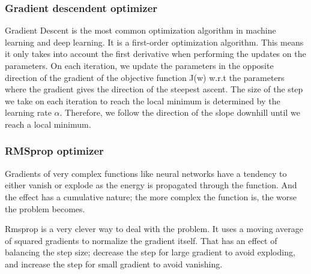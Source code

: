 \subsubsection{Gradient descendent optimizer}

Gradient Descent is the most common optimization algorithm in machine learning and deep learning. It is a first-order optimization algorithm. This means it only takes into account the first derivative when performing the updates on the parameters. On each iteration, we update the parameters in the opposite direction of the gradient of the objective function J(w) w.r.t the parameters where the gradient gives the direction of the steepest ascent. The size of the step we take on each iteration to reach the local minimum is determined by the learning rate $\alpha$. Therefore, we follow the direction of the slope downhill until we reach a local minimum.

\subsubsection{RMSprop optimizer}

Gradients of very complex functions like neural networks have a tendency to either vanish or explode as the energy is propagated through the function. And the effect has a cumulative nature; the more complex the function is, the worse the problem becomes.

Rmsprop is a very clever way to deal with the problem. It uses a moving average of squared gradients to normalize the gradient itself. That has an effect of balancing the step size; decrease the step for large gradient to avoid exploding, and increase the step for small gradient to avoid vanishing.